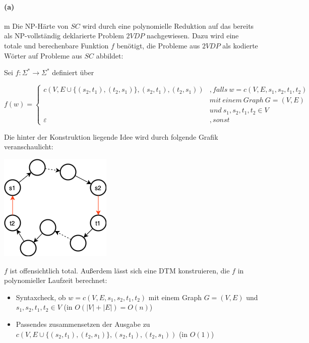 
\paragraph{(a)}m
	Die NP-Härte von $SC$ wird durch eine polynomielle Reduktion auf das bereits als NP-vollständig deklarierte Problem $2VDP$ nachgewiesen. Dazu wird eine totale und berechenbare Funktion $f$ benötigt, die Probleme aus $2VDP$ als kodierte Wörter auf Probleme aus $SC$ abbildet:

	Sei $f:\Sigma^*\rightarrow \Sigma^*$ definiert über

	$f(w)=\begin{cases}
		c(V,E\cup \{(s_2,t_1),(t_2,s_1)\},(s_2,t_1),(t_2,s_1))&, falls\ w=c(V,E,s_1,s_2,t_1,t_2)\\
		&mit\ einem\ Graph\ G=(V,E)\\
		&und\ s_1,s_2,t_1,t_2 \in V\\
		\varepsilon &, sonst
	\end{cases}$

	Die hinter der Konstruktion liegende Idee wird durch folgende Grafik veranschaulicht:

	\includegraphics[scale=0.5]{thinf/sol/f23t1/skizze_reduktion.png}
	
	$f$ ist offensichtlich total. Außerdem lässt sich eine DTM konstruieren, die $f$ in polynomieller Laufzeit berechnet:
	\begin{itemize}
		\item Syntaxcheck, ob $w=c(V,E,s_1,s_2,t_1,t_2)$ mit einem Graph $G=(V,E)$ und $s_1,s_2,t_1,t_2 \in V$ (in $O(|V|+|E|)=O(n)$)
		\item Passendes zusammensetzen der Ausgabe zu $c(V,E\cup \{(s_2,t_1),(t_2,s_1)\},(s_2,t_1),(t_2,s_1))$ (in $O(1)$)
	\end{itemize}

